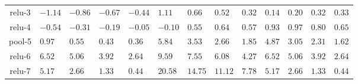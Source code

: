 \documentclass[runningheads]{llncs}
\begin{document}
\begin{table}
\begin{center}
{\begin{tabular}{|c|p{1cm} p{1cm} p{1cm} p{1cm}| p{1cm} p{1cm} p{1cm} p{1cm}|p{1cm} p{1cm} p{1cm} p{1cm}|}
relu-3 & $-1.14$  & $-0.86$   & $-0.67$  & $-0.44$ & $1.11$  & $0.66$  & $0.52$  & $0.32$ & $0.14$  & $0.20$  & $0.32$  & $0.33$   \\
relu-4 & $-0.54$  & $-0.31$  & $-0.19$  & $-0.05$ & $-0.10$  & $0.55$  & $0.64$  & $0.57$  & $0.93$  & $0.97$  & $0.80$  & $0.65$ \\
pool-5 & $0.97$  & $0.55$  & $0.43$  & $0.36$ & $5.84$  & $3.53$  & $2.66$  & $1.85$  & $4.87$  & $3.05$  & $2.31$  & $1.62$   \\
relu-6 & $6.52$  & $5.06$  & $3.92$  & $2.64$  & $9.59$  & $7.55$  & $6.08$  & $4.27$ & $6.52$  & $5.06$  & $3.92$  & $2.64$   \\
relu-7 & $5.17$  & $2.66$  & $1.33$  & $0.44$  & $20.58$  & $14.75$  & $11.12$  & $7.78$  & $5.17$  & $2.66$  & $1.33$  & $0.44$  \\
\hline
\end{tabular}}
\end{center}
\end{table}
\setlength{\tabcolsep}{1.4pt}
\end{document}
